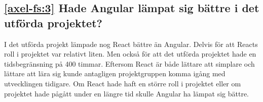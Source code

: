\subsection*{\ref{axel-fs:3}  Hade Angular lämpat sig bättre i det utförda projektet?}
I det utförda projekt lämpade nog React bättre än Angular. Delvis för att Reacts roll i projektet var relativt liten. Men också för att det utförda projektet hade en tidsbegränsning på 400 timmar. Eftersom React är både lättare att simplare och lättare att lära sig kunde antagligen projektgruppen komma igång med utvecklingen tidigare. Om React hade haft en större roll i projektet eller om projektet hade pågått under en längre tid skulle Angular ha lämpat sig bättre.
